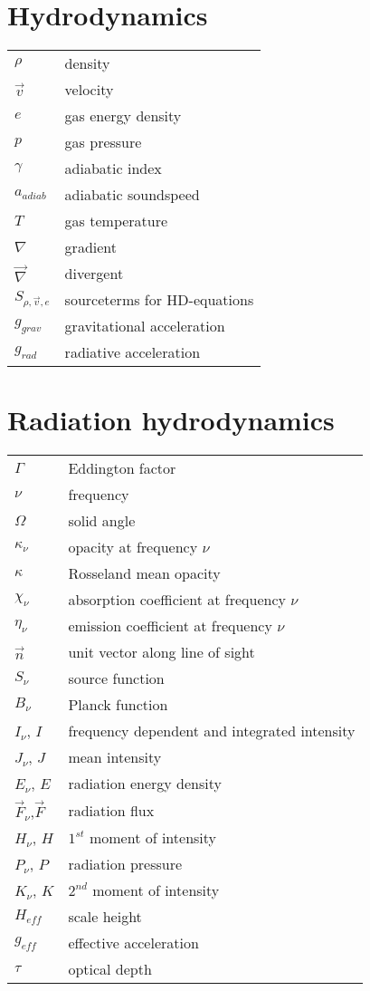 \begin{multicols}{2}
\section*{Hydrodynamics}
\begin{tabular}{ll}
$\rho$         & density       \\
$\vec{v}$      & velocity      \\
$e$		  	   & gas energy density   \\
$p$		  	   & gas pressure  \\
$\gamma$       & adiabatic index \\
$a_{adiab}$    & adiabatic soundspeed \\
$T$		  	   & gas temperature \\
$\nabla$       & gradient\\
$\vec{\nabla}$ & divergent\\
$S_{\rho, \vec{v}, e}$ & sourceterms for HD-equations\\
$g_{grav}$     & gravitational acceleration \\
$g_{rad}$	   & radiative acceleration \\
\end{tabular}


\section*{Radiation hydrodynamics}
\begin{tabular}{ll}
$\Gamma$      & Eddington factor \\
$\nu$         & frequency \\
$\Omega$      & solid angle \\
$\kappa_\nu$  & opacity at frequency $\nu$ \\
$\kappa$      & Rosseland mean opacity\\
$\chi_\nu$    & absorption coefficient at frequency $\nu$ \\
$\eta_\nu$    & emission coefficient at frequency $\nu$ \\
$\vec{n}$     & unit vector along line of sight\\
$S_\nu$       & source function\\
$B_\nu$       & Planck function\\
$I_\nu$, $I$  & frequency dependent and integrated intensity\\
$J_\nu$, $J$  & mean intensity\\
$E_\nu$, $E$  & radiation energy density\\
$\vec{F}_\nu$,$\vec{F}$ & radiation flux\\
$H_\nu$, $H$  & $1^{st}$ moment of intensity\\
$P_\nu$, $P$  & radiation pressure\\
$K_\nu$, $K$  & $2^{nd}$ moment of intensity \\
$H_{eff}$     & scale height \\
$g_{eff}$ 	  & effective acceleration \\
$\tau$        & optical depth \\
\end{tabular}


\end{multicols}
